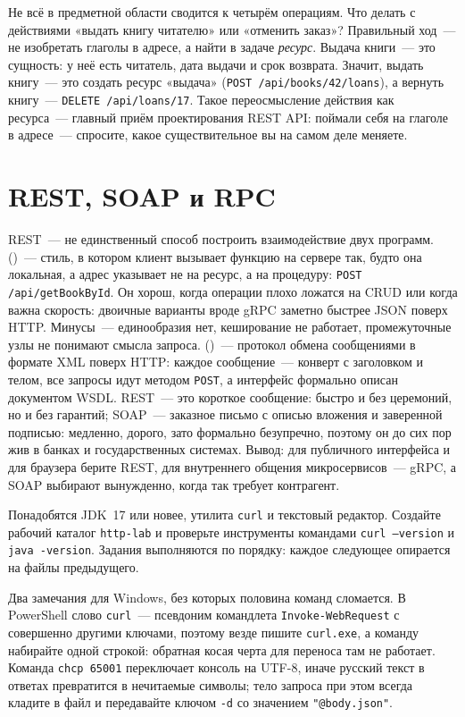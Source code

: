 Не всё в предметной области сводится к четырём операциям. Что делать с
действиями «выдать книгу читателю» или «отменить заказ»? Правильный ход~--- не
изобретать глаголы в адресе, а найти в задаче \emph{ресурс}. Выдача книги~---
это сущность: у неё есть читатель, дата выдачи и срок возврата. Значит, выдать
книгу~--- это создать ресурс «выдача» (\texttt{POST /api/books/42/loans}), а
вернуть книгу~--- \texttt{DELETE /api/loans/17}. Такое переосмысление действия
как ресурса~--- главный приём проектирования REST API: поймали себя на глаголе
в адресе~--- спросите, какое существительное вы на самом деле меняете.

\section{REST, SOAP и RPC}

REST~--- не единственный способ построить взаимодействие двух программ.
 ()~--- стиль, в котором клиент вызывает
функцию на сервере так, будто она локальная, а адрес указывает не на ресурс, а
на процедуру: \texttt{POST /api/getBookById}. Он хорош, когда операции плохо
ложатся на CRUD или когда важна скорость: двоичные варианты вроде gRPC заметно
быстрее JSON поверх HTTP. Минусы~--- единообразия нет, кеширование не работает,
промежуточные узлы не понимают смысла запроса.  ()~--- протокол обмена сообщениями в формате XML поверх HTTP:
каждое сообщение~--- конверт с заголовком и телом, все запросы идут методом
\texttt{POST}, а интерфейс формально описан документом WSDL. REST~--- это
короткое сообщение: быстро и без церемоний, но и без гарантий; SOAP~---
заказное письмо с описью вложения и заверенной подписью: медленно, дорого, зато
формально безупречно, поэтому он до сих пор жив в банках и государственных
системах. Вывод: для публичного интерфейса и для браузера берите REST, для
внутреннего общения микросервисов~--- gRPC, а SOAP выбирают вынужденно, когда
так требует контрагент.

\praktikum{}

Понадобятся JDK~17 или новее, утилита \texttt{curl} и текстовый редактор.
Создайте рабочий каталог \texttt{http-lab} и проверьте инструменты командами
\texttt{curl --version} и \texttt{java -version}. Задания выполняются по
порядку: каждое следующее опирается на файлы предыдущего.

Два замечания для Windows, без которых половина команд сломается. В PowerShell
слово \texttt{curl}~--- псевдоним командлета \texttt{Invoke-WebRequest} с
совершенно другими ключами, поэтому везде пишите \texttt{curl.exe}, а команду
набирайте одной строкой: обратная косая черта для переноса там не работает.
Команда \texttt{chcp 65001} переключает консоль на UTF-8, иначе русский текст в
ответах превратится в нечитаемые символы; тело запроса при этом всегда кладите
в файл и передавайте ключом \texttt{-d} со значением \texttt{"@body.json"}.

